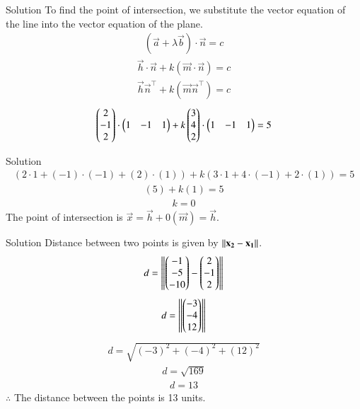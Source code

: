 \documentclass{beamer}
\begin{document}
\begin{frame}{Solution}
To find the point of intersection, we substitute the vector equation of the line into the vector equation of the plane.
\begin{align}
(\vec{a} + \lambda\vec{b}) \cdot \vec{n} = c
\end{align}
\begin{align}
\vec{h} \cdot \vec{n} + k(\vec{m} \cdot \vec{n}) = c
\end{align}
\begin{align}
\vec{h}  \vec{n}^\top + k(\vec{m} \vec{n}^\top) = c
\end{align}
\begin{align}
\begin{pmatrix}2\\-1\\2\end{pmatrix} \cdot \begin{pmatrix}1&-1&1\end{pmatrix} + k\begin{pmatrix}3\\4\\2\end{pmatrix} \cdot \begin{pmatrix}1&-1&1\end{pmatrix} = 5
\end{align}
\end{frame}
\begin{frame}{Solution}
\begin{align}
(2\cdot1+(-1)\cdot(-1)+(2)\cdot(1))+k(3\cdot1+4\cdot(-1)+2\cdot(1)) = 5    
\end{align}
\begin{align}
    (5)+k(1) = 5
\end{align}
\begin{align}
    k = 0
\end{align}
The point of intersection is $\vec{x} = \vec{h} + 0(\vec{m}) = \vec{h} $.
\end{frame}
\begin{frame}{Solution}
    Distance between two points is given by 
$\left\lVert\mathbf{x_2}-\mathbf{x_1}\right\rVert$.\\
\begin{align}
    d=\left\lVert\begin{pmatrix}-1\\-5\\-10\end{pmatrix}-\begin{pmatrix}2\\-1\\2\end{pmatrix}\right\rVert
\end{align}
\begin{align}
    d=\left\lVert\begin{pmatrix}-3\\-4\\12\end{pmatrix}\right\rVert
\end{align}
\begin{align}
    d=\sqrt{(-3)^2+(-4)^2+(12)^2}
\end{align}
\begin{align}
    d=\sqrt{169}
\end{align}
\begin{align}
    d=13
\end{align}
$\therefore$ The distance between the points is 13 units.
\end{frame}
\end{document}
